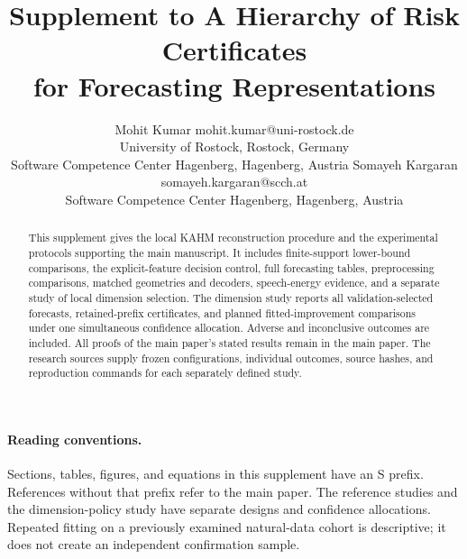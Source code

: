 \documentclass[twoside,11pt]{article}
\begin{document}

\title{Supplement to A Hierarchy of Risk Certificates\\for Forecasting Representations}
\author{\name Mohit Kumar \email mohit.kumar@uni-rostock.de\\
\addr University of Rostock, Rostock, Germany\\
Software Competence Center Hagenberg, Hagenberg, Austria
\AND
\name Somayeh Kargaran \email somayeh.kargaran@scch.at\\
\addr Software Competence Center Hagenberg, Hagenberg, Austria}
\maketitle

\begin{abstract}
This supplement gives the local KAHM reconstruction procedure and the
experimental protocols supporting the main manuscript. It includes
finite-support lower-bound comparisons, the explicit-feature decision control,
full forecasting tables, preprocessing comparisons, matched geometries and
decoders, speech-energy evidence, and a separate study of local dimension
selection. The dimension study reports all validation-selected forecasts,
retained-prefix certificates, and planned fitted-improvement comparisons
under one simultaneous confidence allocation. Adverse and inconclusive
outcomes are included. All proofs of the main paper's stated results remain
in the main paper. The research sources supply frozen configurations,
individual outcomes, source hashes, and reproduction commands for each
separately defined study.
\end{abstract}

\paragraph{Reading conventions.}
Sections, tables, figures, and equations in this supplement have an S prefix.
References without that prefix refer to the main paper. The reference studies
and the dimension-policy study have separate designs and confidence
allocations. Repeated fitting
on a previously examined natural-data cohort is descriptive; it does not
create an independent confirmation sample.















\end{document}
